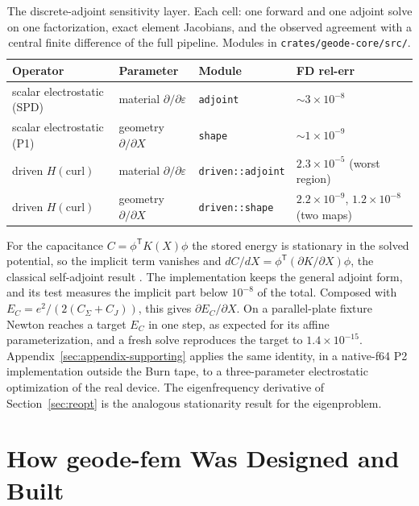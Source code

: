 \documentclass{anvil-paper}
\begin{document}
\begin{table}[htbp]
  \centering
  \caption{The discrete-adjoint sensitivity layer. Each cell: one forward
  and one adjoint solve on one factorization, exact element Jacobians, and
  the observed agreement with a central finite difference of the full
  pipeline. Modules in \texttt{crates/geode-core/src/}.}
  \label{tab:adjoint-matrix}
  \footnotesize
  \begin{tabular}{@{}llll@{}}
    \toprule
    Operator & Parameter & Module & FD rel-err \\
    \midrule
    scalar electrostatic (SPD) & material $\partial/\partial\varepsilon$ &
      \texttt{adjoint} & ${\sim}3\times10^{-8}$ \\
    scalar electrostatic (P1) & geometry $\partial/\partial X$ &
      \texttt{shape} & ${\sim}1\times10^{-9}$ \\
    driven $H(\mathrm{curl})$ & material $\partial/\partial\varepsilon$ &
      \texttt{driven::adjoint} & $2.3\times10^{-5}$ (worst region) \\
    driven $H(\mathrm{curl})$ & geometry $\partial/\partial X$ &
      \texttt{driven::shape} & $2.2\times10^{-9}$, $1.2\times10^{-8}$ (two maps) \\
    \bottomrule
  \end{tabular}
\end{table}

For the capacitance $C = \phi^{\mathsf T}K(X)\phi$ the stored energy is
stationary in the solved potential, so the implicit term vanishes and
$dC/dX = \phi^{\mathsf T}(\partial K/\partial X)\phi$, the classical
self-adjoint result \citep{park2019continuum}. The implementation keeps
the general adjoint form, and its test measures the implicit part below
$10^{-8}$ of the total. Composed with $E_C = e^2/(2(C_\Sigma + C_J))$,
this gives $\partial E_C/\partial X$. On a parallel-plate fixture Newton
reaches a target $E_C$ in one step, as expected for its affine
parameterization, and a fresh solve reproduces the target to
$1.4\times10^{-15}$. Appendix~\ref{sec:appendix-supporting} applies the
same identity, in a native-f64 P2 implementation outside the Burn tape,
to a three-parameter electrostatic optimization of the real device. The
eigenfrequency derivative of Section~\ref{sec:reopt} is the analogous
stationarity result for the eigenproblem.

\section{How geode-fem Was Designed and Built}
\label{sec:built}
\end{document}
